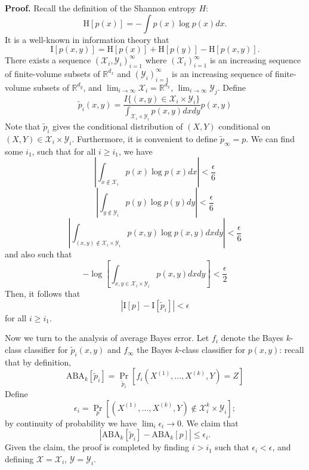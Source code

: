 \textbf{Proof.}
Recall the definition of the Shannon entropy $H$:
\[
\text{H}[p(x)] = - \int p(x) \log p(x) dx.
\]
It is a well-known in information theory that
\[
\text{I}[p(x, y)] = \text{H}[p(x)] + \text{H}[p(y)] - \text{H}[p(x, y)].
\]
There exists a sequence $(\mathcal{X}_i, \mathcal{Y}_i)_{i=1}^\infty$
where $(\mathcal{X}_i)_{i=1}^\infty$ is an increasing sequence of finite-volume subsets of $\mathbb{R}^{d_x}$
and $(\mathcal{Y}_i)_{i=1}^\infty$ is an increasing sequence of finite-volume subsets of $\mathbb{R}^{d_y}$,
and $\lim_{i \to \infty} \mathcal{X}_i = \mathbb{R}^{d_x}$, $\lim_{i \to \infty} \mathcal{Y}_j$.
Define
\[
\tilde{p}_i(x, y) = \frac{I\{(x,y) \in \mathcal{X}_i\times \mathcal{Y}_i\} }{\int_{\mathcal{X}_i \times \mathcal{Y}_i} p(x,y) dx dy} p(x,y)
\]
Note that $\tilde{p}_i$ gives the conditional distribution of $(X, Y)$
conditional on $(X, Y) \in \mathcal{X}_i \times \mathcal{Y}_i$. 
Furthermore, it is convenient to define $\tilde{p}_\infty = p$.
We can find some $i_1$, such that for all $i \geq i_1$, we have
\[
\left|\int_{x \notin \mathcal{X}_i} p(x) \log p(x) dx\right| < \frac{\epsilon}{6}
\]
\[
\left|\int_{y \notin \mathcal{Y}_i} p(y) \log p(y) dy\right| < \frac{\epsilon}{6}
\]
\[
\left|\int_{(x,y) \notin \mathcal{X}_i \times \mathcal{Y}_i} p(x, y) \log p(x, y) dx dy\right| < \frac{\epsilon}{6}
\]
and also such that
\[
-\log \left[\int_{x, y \in \mathcal{X}_i \times \mathcal{Y}_i} p(x, y) dx dy\right] < \frac{\epsilon}{2}
\]
Then, it follows that
\[
|\text{I}[p] - \text{I}[\tilde{p}_i]| < \epsilon
\]
for all $i \geq i_1$.

Now we turn to the analysis of average Bayes error.
Let $f_i$ denote the Bayes $k$-class classifier for $\tilde{p}_i(x, y)$
and
$f_\infty$ the Bayes $k$-class classifier for $p(x, y)$: recall that by definition,
\[
\text{ABA}_k[\tilde{p}_i] = \Pr_{\tilde{p}_i}[f_i(X^{(1)},...,X^{(k)}, Y) = Z]
\]
Define
\[
\epsilon_i = \Pr_p[(X^{(1)},...,X^{(k)}, Y)\notin \mathcal{X}_i^k \times \mathcal{Y}_i];
\]
by continuity of probability we have $\lim_i \epsilon_i \to 0$.
We claim that
\[
|\text{ABA}_k[\tilde{p}_i] - \text{ABA}_k[p]| \leq \epsilon_i.
\]
Given the claim, the proof is completed by finding $i > i_1$ such that $\epsilon_i < \epsilon$,
and defining $\mathcal{X} = \mathcal{X}_i$, $\mathcal{Y} = \mathcal{Y}_i$.

